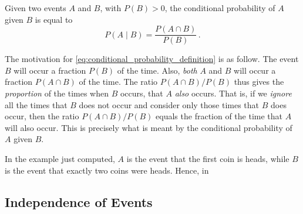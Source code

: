 \begin{definition}
    Given two events $A$ and $B$, with $P(B)>0$, the conditional probability of $A$ given $B$ is equal to
    \begin{equation}\label{eq:conditional_probability_definition}
        P(A\mid B) = \frac{P(A \cap B)}{P(B)}\,.
    \end{equation}
\end{definition}

The motivation for \autoref{eq:conditional_probability_definition} is as follow. The event $B$ will occur a fraction $P(B)$ of the time. Also, \emph{both} $A$ and $B$ will occur a fraction $P(A \cap B)$ of the time. The ratio $P(A \cap B) / P(B)$ thus gives the \emph{proportion} of the times when $B$ occurs, that $A$ \emph{also} occurs. That is, if we \emph{ignore} all the times that $B$ does not occur and consider only those times that $B$ does occur, then the ratio $P(A \cap B)/P(B)$ equals the fraction of the time that $A$ will also occur. This is precisely what is meant by the conditional probability of $A$ given $B$.

In the example just computed, $A$ is the event that the first coin is heads, while $B$ is the event that exactly two coins were heads. Hence, in

\subsection{Independence of Events}\label{independence_of_events}
\lipsum[1-10]
